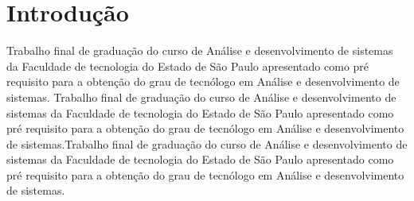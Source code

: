 \chapter{Introdução}
\label{cap1}

Trabalho final de graduação do curso de Análise e desenvolvimento de sistemas da Faculdade de tecnologia do Estado de São Paulo apresentado como pré requisito para a obtenção do grau de tecnólogo em Análise e desenvolvimento de sistemas. Trabalho final de graduação do curso de Análise e desenvolvimento de sistemas da Faculdade de tecnologia do Estado de São Paulo apresentado como pré requisito para a obtenção do grau de tecnólogo em Análise e desenvolvimento de sistemas.Trabalho final de graduação do curso de Análise e desenvolvimento de sistemas da Faculdade de tecnologia do Estado de São Paulo apresentado como pré requisito para a obtenção do grau de tecnólogo em Análise e desenvolvimento de sistemas.